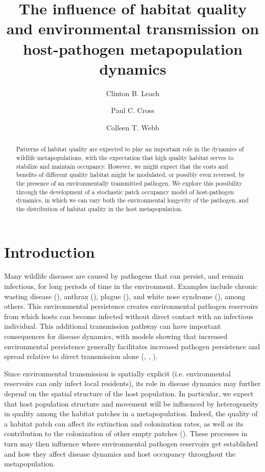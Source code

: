 \documentclass{svjour3}
\begin{document}
\title{The influence of habitat quality and environmental transmission on host-pathogen metapopulation dynamics}

\author{Clinton B. Leach \and Paul C. Cross \and Colleen T. Webb}




\maketitle

\begin{abstract} 
Patterns of habitat quality are expected to play an important role in the dynamics of wildlife metapopulations, with the expectation that high quality habitat serves to stabilize and maintain occupancy.  However, we might expect that the costs and benefits of different quality habitat might be modulated, or possibly even reversed, by the presence of an environmentally transmitted pathogen.  We explore this possibility through the development of a stochastic patch occupancy model of host-pathogen dynamics, in which we can vary both the environmental longevity of the pathogen, and the distribution of habitat quality in the host metapopulation.
\end{abstract}

\section{Introduction}
\label{intro}

Many wildlife diseases are caused by pathogens that can persist, and remain infectious, for long periods of time in the environment.  Examples include chronic wasting disease (\cite{Miller2006}), anthrax (\cite{Dragon1995}), plague (\cite{Eisen2008}), and white nose syndrome (\cite{Lindner2011}), among others.  This environmental persistence creates environmental pathogen reservoirs from which hosts can become infected without direct contact with an infectious individual.  This additional transmission pathway can have important consequences for disease dynamics, with models showing that increased environmental persistence generally facilitates increased pathogen persistence and spread relative to direct transmission alone (\cite{Almberg2011}, \cite{Sharp2011}, \cite{Breban2009}). 

Since environmental transmission is spatially explicit (i.e. environmental reservoirs can only infect local residents), its role in disease dynamics may further depend on the spatial structure of the host population.  In particular, we expect that host population structure and movement will be influenced by heterogeneity in quality among the habitat patches in a metapopulation.  Indeed, the quality of a habitat patch can affect its extinction and colonization rates, as well as its contribution to the colonization of other empty patches (\cite{Moilanen1998}).  These processes in turn may then influence where environmental pathogen reservoirs get established and how they affect disease dynamics and host occupancy throughout the metapopulation.  
\end{document}
